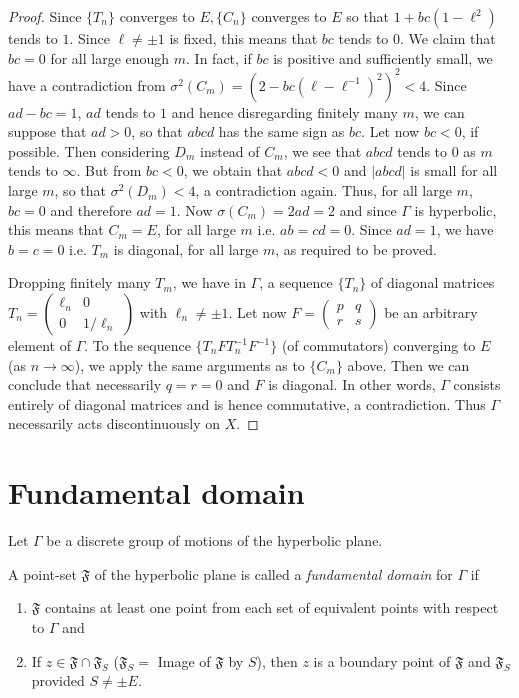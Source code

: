 \begin{proof}
Since $\{T_n\}$ converges to $E,\{C_n\}$ converges to $E$ so that
$1+bc(1-\ell^2)$ tends to $1$. Since $\ell \neq \pm 1$ is fixed, this
means that $bc$ tends to 0. We claim that $bc=0$ for all large enough
$m$. In fact, if $bc$ is positive and sufficiently small, we have a
contradiction from $\sigma^2(C_m)=(2-bc(\ell-\ell^{-1})^2)^2<4$. Since
$ad-bc=1$, $ad$ tends to $1$ and hence \pageoriginale disregarding
finitely many $m$, we can suppose that $ad > 0$, so that $abcd$ has
the same sign as $bc$. Let now $bc<0$, if possible. Then considering
$D_m$ instead of $C_m$, we see that $abcd$ tends to 0 as $m$ tends to
$\infty$. But from $bc <0$, we obtain that $abcd<0$ and $|abcd|$ is
small for all large $m$, so that $\sigma^2(D_m)<4$, a contradiction
again. Thus, for all large $m$, $bc =0$ and therefore $ad=1$. Now
$\sigma(C_m)=2ad =2$ and since $\Gamma$ is hyperbolic, this means that
$C_m = E$, for all large $m$ i.e. $ab=cd =0$. Since $ad=1$, we have
$b=c=0$ i.e. $T_m$ is diagonal, for all large $m$, as required to be
proved.

Dropping finitely many $T_m$, we have in $\Gamma$, a sequence
$\{T_n\}$ of diagonal matrices $T_n = \left(\begin{smallmatrix}
\ell_n & 0 \\ 0 & 1/\ell_n\end{smallmatrix}\right)$ with $\ell_n \neq
\pm 1$. Let now $F= \left(\begin{smallmatrix}
p & q\\r & s\end{smallmatrix}\right)$ be an arbitrary element of
$\Gamma$. To the sequence $\{T_n F T^{-1}_n F^{-1}\}$ (of commutators)
converging to $E$ (as $n\to \infty$), we apply the same arguments as
to $\{C_m\}$ above. Then we can conclude that necessarily $q=r=0$ and
$F$ is diagonal. In other words, $\Gamma$ consists entirely of
diagonal matrices and is hence commutative, a contradiction. Thus
$\Gamma$ necessarily acts discontinuously on $X$.
\end{proof}

\section{Fundamental domain}\label{chap1:sec3}
Let $\Gamma$ be a discrete group of motions of the hyperbolic plane.

\begin{defi*}
A point-set $\mathfrak{F}$ of the hyperbolic plane is called a
{\em fundamental domain} for $\Gamma$ if
\begin{enumerate}
\renewcommand{\labelenumi}{\theenumi)}
\item $\mathfrak{F}$ contains at least one point from each set of
  equivalent points with respect to $\Gamma$ and 

\item If $z\in \mathfrak{F} \cap \mathfrak{F}_S$
  ($\mathfrak{F}_S =$ Image of $\mathfrak{F}$ by $S$), then $z$ is a
  boundary point of $\mathfrak{F}$ and $\mathfrak{F}_S$ provided $S
  \neq \pm E$. 
\end{enumerate}
\end{defi*}

